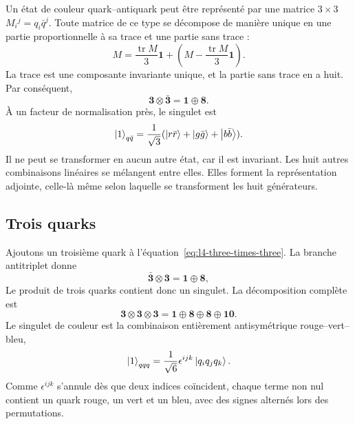 Un état de couleur quark--antiquark peut être représenté par une matrice \(3\times3\) \(M_i{}^j=q_i\bar q^j\). Toute matrice de ce type se décompose de manière unique en une partie proportionnelle à sa trace et une partie sans trace :
\begin{equation}
M=\frac{\operatorname{tr}M}{3}\boldsymbol 1
+\left(M-\frac{\operatorname{tr}M}{3}\boldsymbol 1\right).
\end{equation}
La trace est une composante invariante unique, et la partie sans trace en a huit. Par conséquent,
\begin{equation}
\boldsymbol 3\otimes\bar{\boldsymbol 3}
=\boldsymbol 1\oplus\boldsymbol 8.
\label{eq:l4-three-times-threebar}
\end{equation}
À un facteur de normalisation près, le singulet est
\begin{equation}
\left\lvert1\right\rangle_{q\bar q}
=\frac{1}{\sqrt3}
(\left\lvert r\bar r\right\rangle+\left\lvert g\bar g\right\rangle+\left\lvert b\bar b\right\rangle).
\end{equation}
Il ne peut se transformer en aucun autre état, car il est invariant. Les huit autres combinaisons linéaires se mélangent entre elles. Elles forment la représentation adjointe, celle-là même selon laquelle se transforment les huit générateurs.

\subsection{Trois quarks}

Ajoutons un troisième quark à l’équation~\eqref{eq:l4-three-times-three}. La branche antitriplet donne
\begin{equation}
\bar{\boldsymbol 3}\otimes\boldsymbol 3
=\boldsymbol 1\oplus\boldsymbol 8,
\end{equation}
Le produit de trois quarks contient donc un singulet. La décomposition complète est
\begin{equation}
\boldsymbol 3\otimes\boldsymbol 3\otimes\boldsymbol 3
=\boldsymbol 1\oplus\boldsymbol 8\oplus\boldsymbol 8
\oplus\boldsymbol{10}.
\label{eq:l4-three-quark-full}
\end{equation}
Le singulet de couleur est la combinaison entièrement antisymétrique rouge--vert--bleu,
\begin{equation}
\left\lvert1\right\rangle_{qqq}
=\frac{1}{\sqrt6}\epsilon^{ijk}\left\lvert q_iq_jq_k\right\rangle.
\label{eq:l4-baryon-singlet}
\end{equation}
Comme \(\epsilon^{ijk}\) s’annule dès que deux indices coïncident, chaque terme non nul contient un quark rouge, un vert et un bleu, avec des signes alternés lors des permutations.

